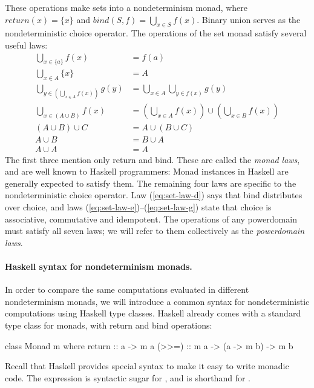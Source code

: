 These operations make sets into a nondeterminism monad, where $\mathit{return}(x) = \{x\}$ and $\mathit{bind}(S, f) = \bigcup_{x \in S}f(x)$. Binary union serves as the nondeterministic choice operator. The operations of the set monad satisfy several useful laws:
\begin{align}
\label{eq:set-law-a}
\textstyle\bigcup_{x\in\{a\}} f(x) & = f(a) \\
\label{eq:set-law-b}
\textstyle\bigcup_{x \in A} \{x\} & = A \\
\label{eq:set-law-c}
\textstyle\bigcup_{y \in \left(\bigcup_{x \in A} f(x)\right)} g(y) & = \textstyle\bigcup_{x \in A}\bigcup_{y \in f(x)} g(y) \\
\label{eq:set-law-d}
\textstyle\bigcup_{x \in (A \cup B)} f(x) & = \textstyle\left(\bigcup_{x \in A} f(x)\right) \cup \left(\bigcup_{x \in B} f(x)\right) \\
\label{eq:set-law-e}
(A \cup B) \cup C & = A \cup (B \cup C) \\
\label{eq:set-law-f}
A \cup B & = B \cup A \\
\label{eq:set-law-g}
A \cup A & = A
\end{align}
The first three mention only return and bind. These are called the \emph{monad laws}, and are well known to Haskell programmers: Monad instances in Haskell are generally expected to satisfy them. The remaining four laws are specific to the nondeterministic choice operator. Law (\ref{eq:set-law-d}) says that bind distributes over choice, and laws (\ref{eq:set-law-e})--(\ref{eq:set-law-g}) state that choice is associative, commutative and idempotent. The operations of any powerdomain must satisfy all seven laws; we will refer to them collectively as the \emph{powerdomain laws}.

\paragraph{Haskell syntax for nondeterminism monads.} In order to compare the same computations evaluated in different nondeterminism monads, we will introduce a common syntax for nondeterministic computations using Haskell type classes. Haskell already comes with a standard type class for monads, with return and bind operations:
\begin{hscode}
class Monad m where
  return :: a -> m a
  (>>=) :: m a -> (a -> m b) -> m b
\end{hscode}
Recall that Haskell provides special syntax to make it easy to write monadic code. The expression  is syntactic sugar for , and  is shorthand for .

